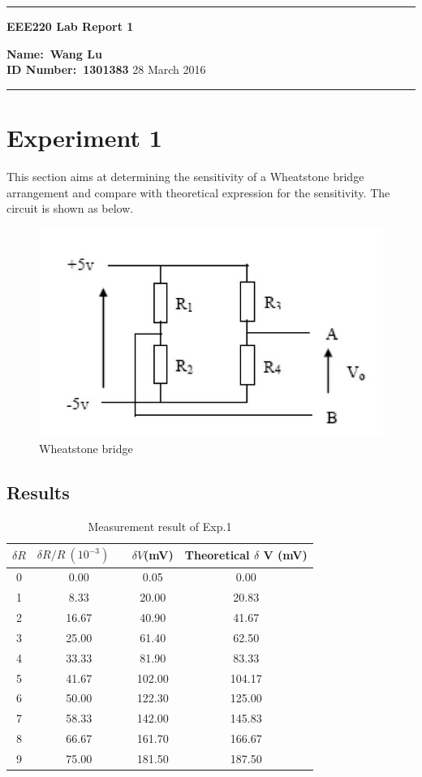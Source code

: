 \documentclass[11pt,a4paper,twoside]{article}
\begin{document}
\begin{center}
\hrule

\vspace{.4cm}
{\bf {\Huge EEE220 Lab Report 1}}
\vspace{.2cm}
\end{center}
{\bf Name:\ Wang Lu }  \\
{\bf ID Number:\ 1301383} \hspace{\fill} 28 March 2016 \\
\hrule


\section{Experiment 1}
This section aims at determining the sensitivity of a Wheatstone bridge arrangement and compare with theoretical expression for the sensitivity. The circuit is shown as below. 

\begin{figure}[!h]
\centering
\includegraphics[width=0.6\linewidth]{1}
\caption{Wheatstone bridge}
\label{f1}
\end{figure}

\subsection{Results}

\begin{table}[!h]
\centering
\begin{tabular}{|c|c|c|c|}
	\hline
	$\delta R $ & $\delta R/R \ (10^{-3})$ \  & $ \delta V $(mV) & Theoretical $\delta$ V (mV) \\
	\hline\hline
	0 & 0.00 & 0.05 & 0.00\\
	\hline
	1 & 8.33 & 20.00 &20.83\\
	\hline
	2 & 16.67 & 40.90 &41.67\\
	\hline
	3 & 25.00 & 61.40 &62.50\\
	\hline
	4 & 33.33 & 81.90 &83.33\\
	\hline
	5 & 41.67 & 102.00 &104.17\\
	\hline
	6 & 50.00 & 122.30 &125.00\\
	\hline
	7 & 58.33 & 142.00 &145.83\\
	\hline
	8 & 66.67 & 161.70 &166.67\\
	\hline
	9 & 75.00 & 181.50 &187.50\\
	\hline
\end{tabular}
\caption{Measurement result of Exp.1}
\label{t1}
\end{table}
\end{document}
